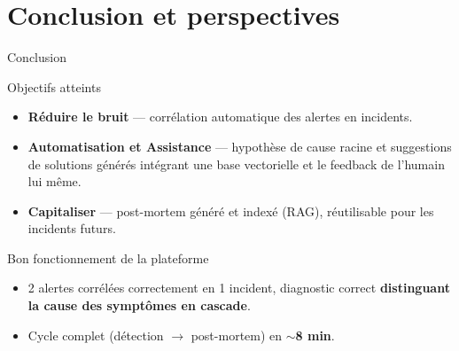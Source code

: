\documentclass{beamer}
\begin{document}
\section{Conclusion et perspectives}

\begin{frame}{Conclusion}
\small

\begin{block}{Objectifs atteints}
\scriptsize
\begin{itemize}
  \item[\ding{45}] \textbf{Réduire le bruit} — corrélation automatique des alertes en incidents.
  \item[\ding{45}] \textbf{Automatisation et Assistance} — hypothèse de cause racine et suggestions de solutions générés intégrant une base vectorielle et le feedback de l'humain lui même.
  \item[\ding{45}] \textbf{Capitaliser} — post-mortem généré et indexé (RAG), réutilisable pour les incidents futurs.
\end{itemize}
\end{block}

\begin{block}{Bon fonctionnement de la plateforme}
\scriptsize
\begin{itemize}
  \item[\ding{45}] 2 alertes corrélées correctement en 1 incident, diagnostic correct \textbf{distinguant la cause des symptômes en cascade}.
  \item[\ding{45}] Cycle complet (détection $\rightarrow$ post-mortem) en \textbf{$\sim$8 min}.
\end{itemize}
\end{block}
\end{frame}
\end{document}
